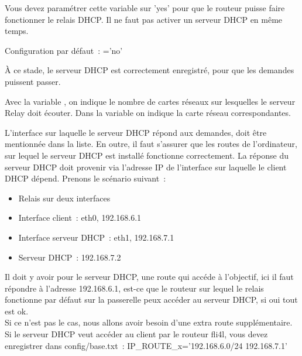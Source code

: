 \begin{description}

    Vous devez paramétrer cette variable sur 'yes' pour que le routeur puisse
    faire fonctionner le relais DHCP. Il ne faut pas activer un serveur DHCP
	en même temps.

    Configuration par défaut~: ='no'


    À ce stade, le serveur DHCP est correctement enregistré, pour que les
    demandes puissent passer.


    Avec la variable , on indique le nombre de cartes
    réseaux sur lesquelles le serveur Relay doit écouter. Dans la variable
     on indique la carte réseau correspondantes.

    L'interface sur laquelle le serveur DHCP répond aux demandes, doit être
    mentionnée dans la liste. En outre, il faut s'assurer que les routes de
    l'ordinateur, sur lequel le serveur DHCP est installé fonctionne correctement.
    La réponse du serveur DHCP doit provenir via l'adresse IP de l'interface
    sur laquelle le client DHCP dépend. Prenons le scénario suivant~:

    \begin{itemize}
    \item Relais sur deux interfaces
    \item Interface client~: eth0, 192.168.6.1
    \item Interface serveur DHCP~:  eth1, 192.168.7.1
    \item Serveur DHCP~:  192.168.7.2
    \end{itemize}

    Il doit y avoir pour le serveur DHCP, une route qui accéde à l'objectif,
    ici il faut répondre à l'adresse 192.168.6.1, est-ce que le routeur sur
    lequel le relais fonctionne par défaut sur la passerelle peux accéder
    au serveur DHCP, si oui tout est ok. \\
    Si ce n'est pas le cas, nous allons avoir besoin d'une extra route
    supplémentaire. Si le serveur DHCP veut accéder au client par le
    routeur fli4l, vous devez enregistrer dans config/base.txt~:
    IP\_ROUTE\_x='192.168.6.0/24 192.168.7.1'


\end{description}
